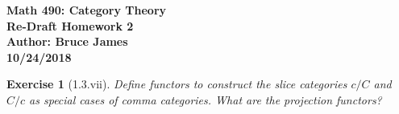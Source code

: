 \documentclass{article}
\newtheorem{lemma}{Exercise}
\begin{document}
	

	\begin{center}
	
{\bf\Large Math 490: Category Theory}\\
\medskip
{\bf Re-Draft Homework 2}\\ 
\medskip
{\bf Author: Bruce James}\\ 
\medskip
{\bf 10/24/2018}\\ 

	\end{center}

\medskip


	\begin{lemma}[1.3.vii]
Define functors to construct the slice categories $c/C$ and $C/c$ as special cases of comma categories. What are the projection functors?	


	\end{lemma}
	
	
\end{document}

